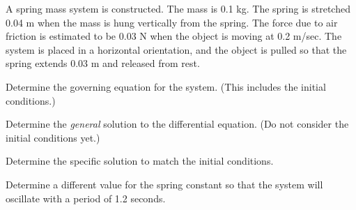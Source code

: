   \begin{problem}

  \item A spring mass system is constructed. The mass is 0.1 kg. The
    spring is stretched 0.04 m when the mass is hung vertically from
    the spring. The force due to air friction is estimated to be 0.03
    N when the object is moving at 0.2 m/sec. The system is placed in
    a horizontal orientation, and the object is pulled so that the
    spring extends 0.03 m and released from rest.

    \begin{subproblem}
      \item Determine the governing equation for the system. (This
        includes the initial conditions.)
        \vfill

      \item Determine the \textit{general} solution to the differential
        equation. (Do not consider the initial conditions yet.)
        \vfill

        \clearpage

      \item Determine the specific solution to match the initial conditions.

        \vfill

      \item Determine a different value for the spring constant so
        that the system will oscillate with a period of 1.2 seconds.
        \vfill

    \end{subproblem}



  \end{problem}




